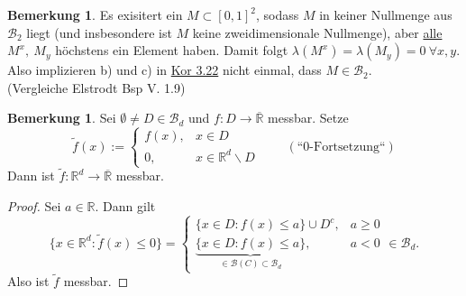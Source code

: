 \documentclass[a4paper]{scrreprt}
\newcommand{\R}{\mathbb{R}}
\newcommand{\Rq}{\overline{\R}}
\newcommand{\Borel}{\mathcal{B}}
\newcommand{\Bd}{\Borel_d}
\newcommand{\jlabel}[1]{\label{j_#1}}
\newcommand{\jhyperref}[2]{\hyperref[j_#1]{#2}}
\newcommand{\jlink}[1]{\jhyperref{#1}{#1}}
\newcommand{\jabb}[3]{ #1: #2 \rightarrow #3 }
\theoremstyle{plain}
\theoremstyle{definition}
\newtheorem{bem}[thm]{Bemerkung}
\begin{document}
{{{{\begin{bem}
\jlabel{Bem 3.23}
    Es exisitert ein $M\subset [0,1]^2$, sodass $M$ in keiner Nullmenge aus $\Borel_2$ liegt (und insbesondere ist $M$ keine zweidimensionale Nullmenge), aber \uline{alle} $M^x,\ M_y$ höchstens ein Element haben. Damit folgt $\lambda(M^x) = \lambda(M_y) = 0 \ \forall x,y$.\\
    Also implizieren b) und c) in \jlink{Kor 3.22} nicht einmal, dass $M\in\Borel_2$.\\
    (Vergleiche Elstrodt Bsp V. 1.9)
\end{bem}


\begin{bem}
\jlabel{Bem 3.24}
    Sei $\emptyset \ne D\in \Bd$ und $\jabb{f}{D}{\Rq}$ messbar. Setze
    \begin{displaymath}
        \tilde{f}(x) := \begin{cases} f(x), &x\in D\\ 0, &x\in \R^d\backslash D \end{cases} \hspace{25pt} (\text{``0-Fortsetzung``})
    \end{displaymath}
    Dann ist $\jabb{\tilde{f}}{\R^d}{\Rq}$ messbar.
    \begin{proof}
        Sei $a\in \R$. Dann gilt
        \begin{displaymath}
            \{x\in \R^d : \tilde{f}(x) \le 0\} = \begin{cases} \{x\in D : f(x) \le a\} \cup D^c, &a\ge 0\\ \underbrace{\{x\in D: f(x)\le a\}}_{\in\Borel(C) \subset \Bd}, &a < 0 \end{cases} \in \Bd.
        \end{displaymath}
        Also ist $\tilde{f}$ messbar.
    \end{proof}
\end{bem}


}}}}
\end{document}

